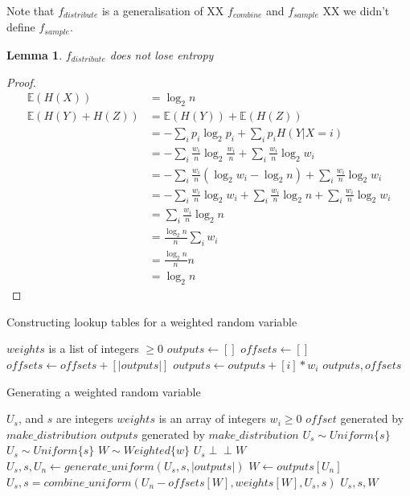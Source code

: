 \documentclass[12pt]{article}
\newtheorem{lemma}{Lemma}
\newcommand{\indep}{\perp\!\!\!\perp}
\begin{document}
Note that $f_{distribute}$ is a generalisation of XX $f_{combine}$ and $f_{sample}$ XX we didn't define $f_{sample}$.

\begin{lemma}
    \label{lem:distribution-conservation}
    $f_{distribute}$ does not lose entropy
\end{lemma}

\begin{proof}
    \begin{align}
    \mathbb{E}(H(X)) & = \log_2 n \\
    \mathbb{E}(H(Y) + H(Z)) &=  \mathbb{E}(H(Y)) + \mathbb{E}(H(Z)) \\
               & = - \sum_i p_i \log_2p_i + \sum_i p_iH(Y|X=i) \\
               & = - \sum_i \frac{w_i}{n} \log_2 \frac{w_i}{n} + \sum_i \frac{w_i}{n}\log_2 w_i \\
               & = - \sum_i \frac{w_i}{n}(\log_2 w_i - \log_2 n) + \sum_i \frac{w_i}{n}\log_2 w_i \\
               & = - \sum_i \frac{w_i}{n}\log_2 w_i + \sum_i \frac{w_i}{n} \log_2 n + \sum_i \frac{w_i}{n}\log_2 w_i \\
               & = \sum_i \frac{w_i}{n} \log_2 n \\
               & = \frac{\log_2 n}{n} \sum_i w_i \\
               & = \frac{\log_2 n}{n} n \\
               & = \log_2 n
    \end{align}
\end{proof}

\begin{algorithm}
\caption{Constructing lookup tables for a weighted random variable}
\label{alg:generate-lookup-tables}
\begin{algorithmic}[1]
\Require $weights$ is a list of integers $\ge0$
  \State $outputs \gets []$
  \State $offsets \gets []$
    \State $offsets \gets offsets + [|outputs|]$
    \State $outputs \gets outputs + [i] * w_i$
  \EndFor
  \State \Return $outputs, offsets$
\EndProcedure
\end{algorithmic}
\end{algorithm}


\begin{algorithm}
\caption{Generating a weighted random variable}
\label{alg:generate-weighted}
\begin{algorithmic}[1]
\Require $U_s$, and $s$ are integers
\Require $weights$ is an array of integers $w_i \ge 0$
\Require $offset$ generated by $make\_distribution$ 
\Require $outputs$ generated by $make\_distribution$
\Require $U_s \sim Uniform\{s\}$
\Ensure $U_s \sim Uniform\{s\}$
\Ensure $W \sim Weighted\{w\}$
\Ensure $U_s \indep W$
    \State $U_s, s, U_n \gets generate\_uniform(U_s, s, |outputs|)$
    \State $W \gets outputs[U_n]$
    \State $U_s, s = combine\_uniform(U_n - offsets[W], weights[W], U_s, s)$
    \State \Return $U_s, s, W$
\EndProcedure
\end{algorithmic}
\end{algorithm}
\end{document}
